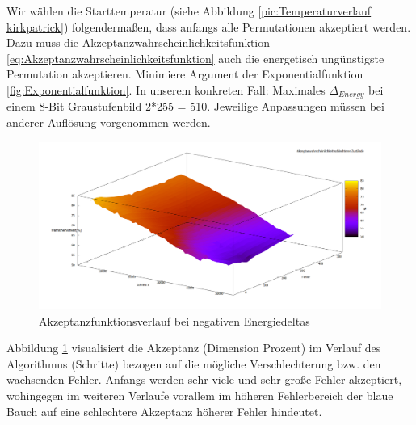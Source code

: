 Wir wählen die Starttemperatur (siehe Abbildung \ref{pic:Temperaturverlauf kirkpatrick}) folgendermaßen, dass 
anfangs alle Permutationen akzeptiert werden. Dazu muss die 
Akzeptanzwahrscheinlichkeitsfunktion \ref{eq:Akzeptanzwahrscheinlichkeitsfunktion} auch die energetisch
ungünstigste Permutation akzeptieren. Minimiere Argument der Exponentialfunktion \ref{fig:Exponentialfunktion}.
In unserem konkreten Fall: Maximales $\Delta_{Energy}$ bei einem 8-Bit Graustufenbild 2*255 = 510. Jeweilige 
Anpassungen müssen bei anderer Auflösung vorgenommen werden.

\begin{figure}[H]
    \centering
    \includegraphics[width=\linewidth]{content/simulatedAnnealing/Bilder/Akzeptanzwahrscheinlichkeit.png}
    \caption{Akzeptanzfunktionsverlauf bei negativen Energiedeltas}
    \label{pic:Akzeptanzfunktionsverlauf kirkpatrick}
\end{figure}

Abbildung \ref{pic:Akzeptanzfunktionsverlauf kirkpatrick} visualisiert die Akzeptanz (Dimension Prozent) im Verlauf 
des Algorithmus (Schritte) bezogen auf die mögliche Verschlechterung bzw. den wachsenden Fehler. Anfangs werden sehr viele 
und sehr große Fehler akzeptiert, wohingegen im weiteren Verlaufe vorallem im höheren Fehlerbereich der blaue Bauch auf eine 
schlechtere Akzeptanz höherer Fehler hindeutet.

